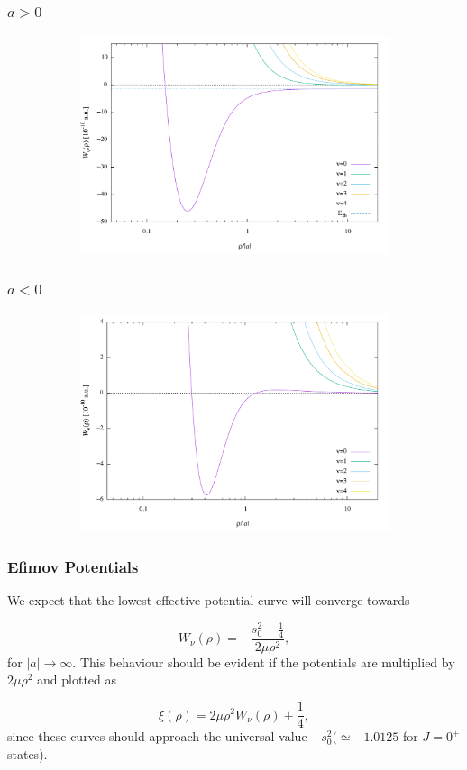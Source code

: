 \documentclass{beamer}
\begin{document}
\begin{frame}
\frametitle{$a>0$}
\begin{figure}
	\begin{figure}
		\includegraphics[width=0.8\linewidth]{Wpos.pdf}
	\end{figure}
\end{figure}
\end{frame}

\begin{frame}
\frametitle{$a<0$}
\begin{figure}
	\begin{figure}
		\includegraphics[width=0.8\linewidth]{Wneg.pdf}
	\end{figure}
\end{figure}
\end{frame}


\begin{frame}
\frametitle{Efimov Potentials}
We expect that the lowest effective potential curve will converge towards

\begin{equation}
W_{\nu}(\rho) = -\frac{s_0^2+\frac{1}{4}}{2\mu \rho^2},
\end{equation} 
for $|a| \rightarrow \infty$. This behaviour should be evident if the potentials are multiplied by $2 \mu \rho^2$ and plotted as 

\begin{equation}\label{eq:lambda}
\xi(\rho) = 2 \mu \rho^2 W_{\nu}(\rho) + \frac{1}{4},
\end{equation}
since these curves should approach the universal value $-s_0^2 (\simeq -1.0125$ for $J=0^+$ states).
\end{frame}
\end{document}

